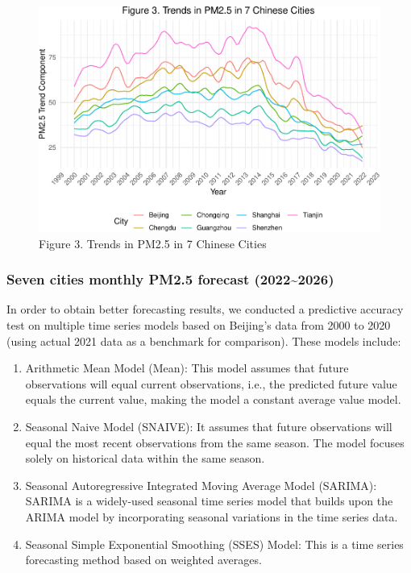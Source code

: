 \documentclass[
  12pt,
]{article}
\providecommand{\tightlist}{%
  \setlength{\itemsep}{0pt}\setlength{\parskip}{0pt}}
\begin{document}
\begin{figure}
\centering
\includegraphics{LiFangRenZhang_ENV872_Project_files/figure-latex/trend figure-1.pdf}
\caption{Figure 3. Trends in PM2.5 in 7 Chinese Cities}
\end{figure}

\hypertarget{seven-cities-monthly-pm2.5-forecast-20222026}{%
\subsubsection{Seven cities monthly PM2.5 forecast
(2022\textasciitilde2026)}\label{seven-cities-monthly-pm2.5-forecast-20222026}}

In order to obtain better forecasting results, we conducted a predictive
accuracy test on multiple time series models based on Beijing's data
from 2000 to 2020 (using actual 2021 data as a benchmark for
comparison). These models include:

\begin{enumerate}
\def\labelenumi{\arabic{enumi}.}
\tightlist
\item
  Arithmetic Mean Model (Mean): This model assumes that future
  observations will equal current observations, i.e., the predicted
  future value equals the current value, making the model a constant
  average value model.
\item
  Seasonal Naive Model (SNAIVE): It assumes that future observations
  will equal the most recent observations from the same season. The
  model focuses solely on historical data within the same season.
\item
  Seasonal Autoregressive Integrated Moving Average Model (SARIMA):
  SARIMA is a widely-used seasonal time series model that builds upon
  the ARIMA model by incorporating seasonal variations in the time
  series data.
\item
  Seasonal Simple Exponential Smoothing (SSES) Model: This is a time
  series forecasting method based on weighted averages.
\end{enumerate}
\end{document}
